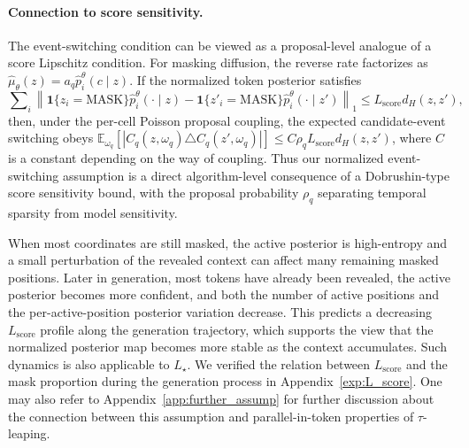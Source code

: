 \documentclass{article}
\begin{document}
\paragraph{Connection to score sensitivity.}
The event-switching condition can be viewed as a proposal-level analogue of a score Lipschitz condition. 
For masking diffusion, the reverse rate factorizes as $\widehat\mu_{\theta}(z)=a_q\widehat p_i^\theta(c\mid z)$.
If the normalized token posterior satisfies
\[
\sum\nolimits_i
\left\|
\mathbf 1\{z_i=\mathrm{MASK}\}\widehat p_i^\theta(\cdot\mid z)
-
\mathbf 1\{z'_i=\mathrm{MASK}\}\widehat p_i^\theta(\cdot\mid z')
\right\|_1
\le
L_{\mathrm{score}}d_H(z,z'),
\]
then, under the per-cell Poisson proposal coupling, the expected candidate-event switching obeys $\mathbb E_{\omega_q}
\left[
|C_q(z,\omega_q)\triangle C_q(z',\omega_q)|
\right]
\le
C\rho_qL_{\mathrm{score}}d_H(z,z')$, where $C$ is a constant depending on the way of coupling. Thus our normalized event-switching assumption is a direct algorithm-level consequence of a Dobrushin-type score sensitivity bound, with the proposal probability \(\rho_q\) separating temporal sparsity from model sensitivity. 

When most coordinates are still masked, the active posterior is high-entropy and a small perturbation of the revealed context can affect many remaining masked positions. Later in generation, most tokens have already been revealed, the active posterior becomes more confident, and both the number of active positions and the per-active-position posterior variation decrease. This predicts a decreasing \(L_{\mathrm{score}}\) profile along the generation trajectory, which supports the view that the normalized posterior map becomes more stable as the context accumulates. Such dynamics is also applicable to \(L_{\star}\). We verified the relation between $L_{\mathrm{score}}$ and the mask proportion during the generation process in Appendix~\ref{exp:L_score}.  One may also refer to Appendix~\ref{app:further_assump} for further discussion about the connection between this assumption and parallel-in-token properties of $\tau$-leaping. 
\end{document}
